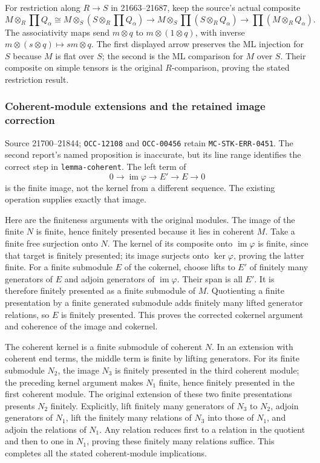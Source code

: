 For restriction along \(R\to S\) in 21663--21687, keep the source's actual composite \[
M\otimes_R\prod Q_\alpha
\cong M\otimes_S(S\otimes_R\prod Q_\alpha)
\longrightarrow M\otimes_S\prod(S\otimes_RQ_\alpha)
\longrightarrow\prod(M\otimes_RQ_\alpha).
\] The associativity maps send \(m\otimes q\) to \(m\otimes(1\otimes q)\), with inverse \(m\otimes(s\otimes q)\mapsto sm\otimes q\). The first displayed arrow preserves the ML injection for \(S\) because \(M\) is flat over \(S\); the second is the ML comparison for \(M\) over \(S\). Their composite on simple tensors is the original \(R\)-comparison, proving the stated restriction result.

\subsubsection{Coherent-module extensions and the retained image correction}\label{algebra-proof-013-coherent-module-extensions-and-the-retained-image-correction}

Source 21700--21844; \texttt{OCC-12108} and \texttt{OCC-00456} retain \texttt{MC-STK-ERR-0451}. The second report's named proposition is inaccurate, but its line range identifies the correct step in \texttt{lemma-coherent}. The left term of \[
0\longrightarrow\operatorname{im}\varphi\longrightarrow E'\longrightarrow E\longrightarrow0
\] is the finite image, not the kernel from a different sequence. The existing operation supplies exactly that image.

Here are the finiteness arguments with the original modules. The image of the finite \(N\) is finite, hence finitely presented because it lies in coherent \(M\). Take a finite free surjection onto \(N\). The kernel of its composite onto \(\operatorname{im}\varphi\) is finite, since that target is finitely presented; its image surjects onto \(\ker\varphi\), proving the latter finite. For a finite submodule \(E\) of the cokernel, choose lifts to \(E'\) of finitely many generators of \(E\) and adjoin generators of \(\operatorname{im}\varphi\). Their span is all \(E'\). It is therefore finitely presented as a finite submodule of \(M\). Quotienting a finite presentation by a finite generated submodule adds finitely many lifted generator relations, so \(E\) is finitely presented. This proves the corrected cokernel argument and coherence of the image and cokernel.

The coherent kernel is a finite submodule of coherent \(N\). In an extension with coherent end terms, the middle term is finite by lifting generators. For its finite submodule \(N_2\), the image \(N_3\) is finitely presented in the third coherent module; the preceding kernel argument makes \(N_1\) finite, hence finitely presented in the first coherent module. The original extension of these two finite presentations presents \(N_2\) finitely. Explicitly, lift finitely many generators of \(N_3\) to \(N_2\), adjoin generators of \(N_1\), lift the finitely many relations of \(N_3\) into those of \(N_1\), and adjoin the relations of \(N_1\). Any relation reduces first to a relation in the quotient and then to one in \(N_1\), proving these finitely many relations suffice. This completes all the stated coherent-module implications.

